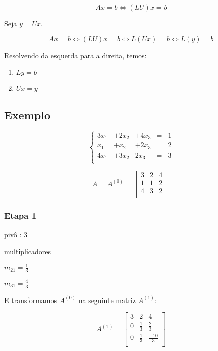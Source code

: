 \documentclass[a4paper]{article}
\begin{document}
\begin{displaymath}
  Ax = b \iff (LU)x=b
\end{displaymath}

Seja $y = Ux$. 

\begin{displaymath}
  Ax = b \iff (LU)x=b \iff L(Ux)=b \iff L(y) = b
\end{displaymath}

Resolvendo da esquerda para a direita, temos:

\begin{enumerate}
\item $Ly = b$
\item $Ux = y$
\end{enumerate}

\subsection*{Exemplo}

\begin{displaymath}
  \left\{
  \begin{array}{ccccc}
    3x_1 &+ 2x_2 &+ 4x_3 &=&1\\
    x_1 &+ x_2 &+ 2x_3 &=& 2\\
    4x_1 &+ 3x_2 & 2x_3 &=& 3\\
  \end{array}
\right.
\end{displaymath}

\begin{displaymath}
  A = A^{(0)} = \begin{bmatrix}
    3 & 2 & 4 \\
    1 & 1 & 2 \\
    4 & 3 & 2 \\
  \end{bmatrix}
\end{displaymath}


\subsubsection*{Etapa 1}
pivô : $3$

multiplicadores 

$m_{21}= \frac{1}{3}$

$m_{31} = \frac{4}{3}$

E transformamos $A^{(0)}$ na seguinte matriz $A^{(1)}$:

\begin{displaymath}
  A^{(1)} = \begin{bmatrix}
    3 & 2 & 4\\
    0 & \frac{1}{3} & \frac{2}{3}\\
    0 & \frac{1}{3} & \frac{-10}{3}\\
  \end{bmatrix}
\end{displaymath}
\end{document}
